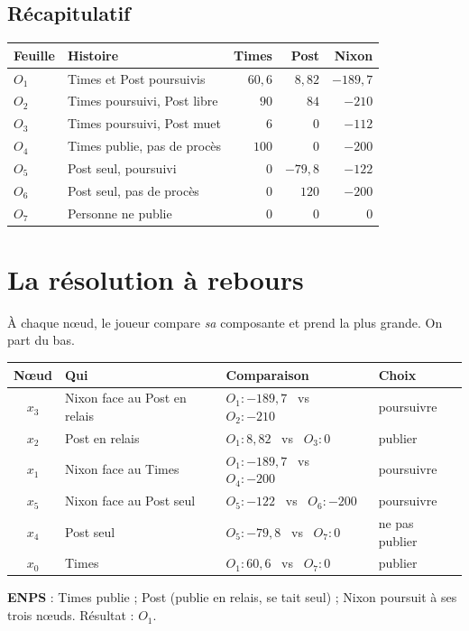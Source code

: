 \documentclass[11pt,a4paper]{article}
\theoremstyle{definition}
\newcommand{\T}[1]{\textcolor{nyt}{#1}}
\newcommand{\W}[1]{\textcolor{wp}{#1}}
\newcommand{\N}[1]{\textcolor{gov}{#1}}
\begin{document}
\subsection*{Récapitulatif}
\begin{center}
\small
\begin{tabular}{@{}llrrr@{}}
\toprule
Feuille & Histoire & \T{Times} & \W{Post} & \N{Nixon} \\
\midrule
$O_1$ & Times et Post poursuivis & $60,6$ & $8,82$ & $-189,7$ \\
$O_2$ & Times poursuivi, Post libre & $90$ & $84$ & $-210$ \\
$O_3$ & Times poursuivi, Post muet & $6$ & $0$ & $-112$ \\
$O_4$ & Times publie, pas de procès & $100$ & $0$ & $-200$ \\
$O_5$ & Post seul, poursuivi & $0$ & $-79,8$ & $-122$ \\
$O_6$ & Post seul, pas de procès & $0$ & $120$ & $-200$ \\
$O_7$ & Personne ne publie & $0$ & $0$ & $0$ \\
\bottomrule
\end{tabular}
\end{center}

\section{La résolution à rebours}
À chaque nœud, le joueur compare \emph{sa} composante et prend la plus grande. On part du bas.
\begin{center}
\small
\begin{tabular}{@{}clll@{}}
\toprule
Nœud & Qui & Comparaison & Choix \\
\midrule
$x_3$ & \N{Nixon} face au Post en relais & $O_1:-189,7$ \ vs \ $O_2:-210$ & poursuivre \\
$x_2$ & \W{Post} en relais & $O_1:8,82$ \ vs \ $O_3:0$ & publier \\
$x_1$ & \N{Nixon} face au Times & $O_1:-189,7$ \ vs \ $O_4:-200$ & poursuivre \\
$x_5$ & \N{Nixon} face au Post seul & $O_5:-122$ \ vs \ $O_6:-200$ & poursuivre \\
$x_4$ & \W{Post} seul & $O_5:-79,8$ \ vs \ $O_7:0$ & ne pas publier \\
$x_0$ & \T{Times} & $O_1:60,6$ \ vs \ $O_7:0$ & publier \\
\bottomrule
\end{tabular}
\end{center}
\textbf{ENPS} : Times publie ; Post (publie en relais, se tait seul) ; Nixon poursuit à ses trois nœuds. Résultat : $O_1$.
\end{document}
